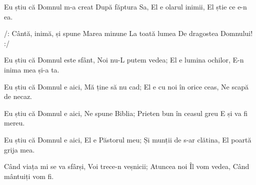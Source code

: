 \beginverse
Eu știu că Domnul m-a creat
După făptura Sa,
El e olarul inimii,
El știe ce e-n ea.
\endverse

\beginchorus
/: Cântă, inimă, și spune
Marea minune
La toată lumea
De dragostea Domnului! :/
\endchorus

\beginverse
Eu știu că Domnul este sfânt,
Noi nu-L putem vedea;
El e lumina ochilor,
E-n inima mea și-a ta.
\endverse

\beginverse
Eu știu că Domnul e aici,
Mă ține să nu cad;
El e cu noi în orice ceas,
Ne scapă de necaz.
\endverse

\beginverse
Eu știu că Domnul e aici,
Ne spune Biblia;
Prieten bun în ceasul greu
E și va fi mereu.
\endverse

\beginverse
Eu știu că Domnul e aici,
El e Păstorul meu;
Și munții de s-ar clătina,
El poartă grija mea.
\endverse

\beginverse
Când viața mi se va sfârși,
Voi trece-n veșnicii;
Atuncea noi Îl vom vedea,
Când mântuiți vom fi.
\endverse
\endsong